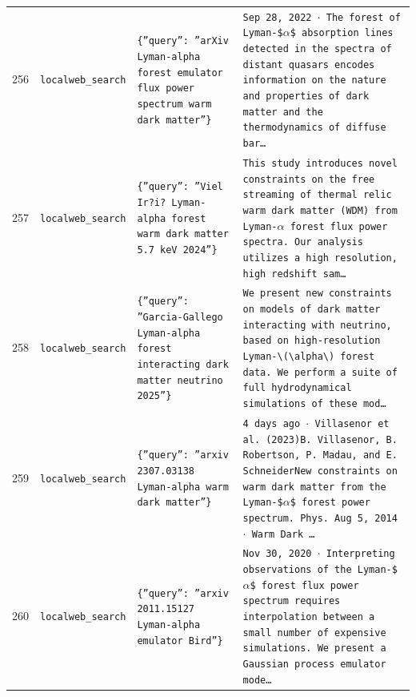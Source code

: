 \documentclass[11pt,a4paper]{article}
\begin{document}
\begin{longtable}{@{}p{}p{}p{}p{}@{}}
256 & \texttt{local}\newline\texttt{web\_\allowbreak{}search} & \texttt{\{''query'':\allowbreak{} ''arXiv Lyman-alpha forest emulator flux power spectrum warm dark matter''\}\allowbreak{}} & \texttt{Sep 28,\allowbreak{} 2022 $\cdot$ The forest of Lyman-\$$\alpha$\$ absorption lines detected in the spectra of distant quasars encodes information on the nature and properties of dark matter and the thermodynamics of diffuse bar\ldots{}\allowbreak{}} \\
257 & \texttt{local}\newline\texttt{web\_\allowbreak{}search} & \texttt{\{''query'':\allowbreak{} ''Viel Ir?i? Lyman-alpha forest warm dark matter 5.7 keV 2024''\}\allowbreak{}} & \texttt{This study introduces novel constraints on the free streaming of thermal relic warm dark matter (WDM)\allowbreak{} from Lyman-$\alpha$ forest flux power spectra. Our analysis utilizes a high resolution,\allowbreak{} high redshift sam\ldots{}\allowbreak{}} \\
258 & \texttt{local}\newline\texttt{web\_\allowbreak{}search} & \texttt{\{''query'':\allowbreak{} ''Garcia-Gallego Lyman-alpha forest interacting dark matter neutrino 2025''\}\allowbreak{}} & \texttt{We present new constraints on models of dark matter interacting with neutrino,\allowbreak{} based on high-resolution Lyman-\textbackslash{}\allowbreak{}(\textbackslash{}\allowbreak{}alpha\textbackslash{}\allowbreak{})\allowbreak{} forest data. We perform a suite of full hydrodynamical simulations of these mod\ldots{}\allowbreak{}} \\
259 & \texttt{local}\newline\texttt{web\_\allowbreak{}search} & \texttt{\{''query'':\allowbreak{} ''arxiv 2307.03138 Lyman-alpha warm dark matter''\}\allowbreak{}} & \texttt{4 days ago $\cdot$ Villasenor et al. (2023)\allowbreak{}B. Villasenor,\allowbreak{} B. Robertson,\allowbreak{} P. Madau,\allowbreak{} and E. SchneiderNew constraints on warm dark matter from the Lyman-\$$\alpha$\$ forest power spectrum. Phys. Aug 5,\allowbreak{} 2014 $\cdot$ Warm Dark \ldots{}\allowbreak{}} \\
260 & \texttt{local}\newline\texttt{web\_\allowbreak{}search} & \texttt{\{''query'':\allowbreak{} ''arxiv 2011.15127 Lyman-alpha emulator Bird''\}\allowbreak{}} & \texttt{Nov 30,\allowbreak{} 2020 $\cdot$ Interpreting observations of the Lyman-\$$\alpha$\$ forest flux power spectrum requires interpolation between a small number of expensive simulations. We present a Gaussian process emulator mode\ldots{}\allowbreak{}} \\

\end{longtable}
\end{document}
